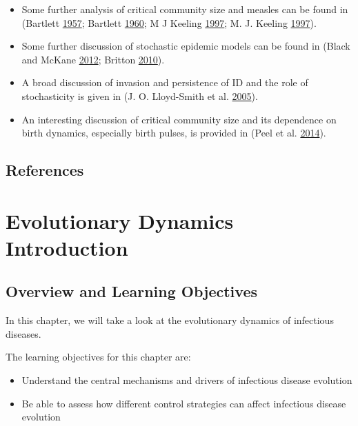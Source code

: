 \documentclass[]{book}
\providecommand{\tightlist}{%
  \setlength{\itemsep}{0pt}\setlength{\parskip}{0pt}}
\theoremstyle{definition}
\theoremstyle{definition}
\theoremstyle{definition}
\theoremstyle{remark}
\begin{document}
\begin{itemize}
\tightlist
\item
  Some further analysis of critical community size and measles can be
  found in (Bartlett \protect\hyperlink{ref-bartlett57}{1957}; Bartlett
  \protect\hyperlink{ref-bartlett60}{1960}; M J Keeling
  \protect\hyperlink{ref-keeling97}{1997}; M. J. Keeling
  \protect\hyperlink{ref-keeling97a}{1997}).
\item
  Some further discussion of stochastic epidemic models can be found in
  (Black and McKane \protect\hyperlink{ref-black12}{2012}; Britton
  \protect\hyperlink{ref-britton10a}{2010}).
\item
  A broad discussion of invasion and persistence of ID and the role of
  stochasticity is given in (J. O. Lloyd-Smith et al.
  \protect\hyperlink{ref-lloyd-smith05b}{2005}).
\item
  An interesting discussion of critical community size and its
  dependence on birth dynamics, especially birth pulses, is provided in
  (Peel et al. \protect\hyperlink{ref-peel14}{2014}).
\end{itemize}

\section{References}\label{references-13}

\chapter{Evolutionary Dynamics
Introduction}\label{evolutionary-dynamics-introduction}

\section{Overview and Learning
Objectives}\label{overview-and-learning-objectives-13}

In this chapter, we will take a look at the evolutionary dynamics of
infectious diseases.

The learning objectives for this chapter are:

\begin{itemize}
\tightlist
\item
  Understand the central mechanisms and drivers of infectious disease
  evolution
\item
  Be able to assess how different control strategies can affect
  infectious disease evolution
\end{itemize}
\end{document}
